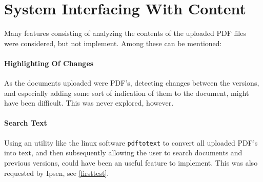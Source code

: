 \documentclass[../../master.tex]{subfiles}
\begin{document}
\section{System Interfacing With Content}
Many features consisting of analyzing the contents of the uploaded PDF files were considered, but not implement. Among these can be mentioned:

\paragraph{Highlighting Of Changes}
As the documents uploaded were PDF's, detecting changes between the versions, and especially adding some sort of indication of them to the document, might have been difficult.
This was never explored, however.

\paragraph{Search Text}
Using an utility like the linux software \texttt{pdftotext} to convert all uploaded PDF's into text, and then subsequently allowing the user to search documents and previous versions, could have been an useful feature to implement.
This was also requested by Ipsen, see \cref{firsttest}.
\end{document}
